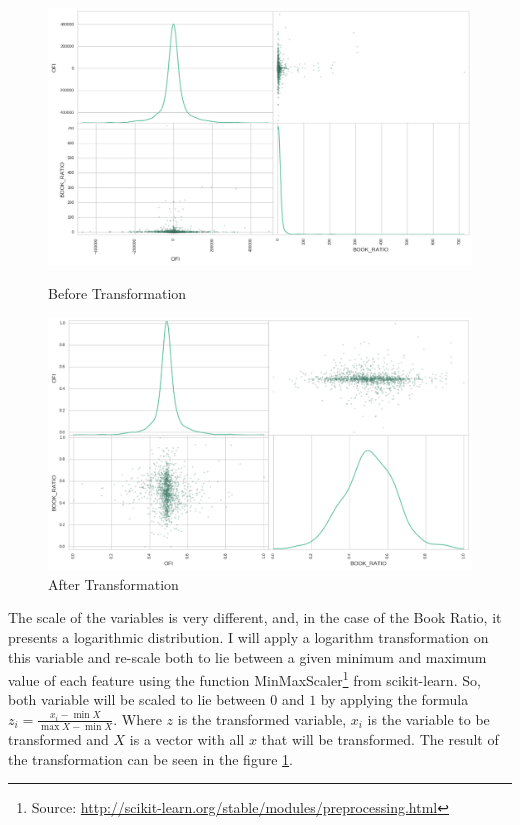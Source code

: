 \documentclass[a4paper]{article}
\begin{document}
\begin{figure}[ht!]
  \includegraphics[width=\linewidth]{figures/scatter_feat_1.png}
  \caption{\label{fig:features_one}Before Transformation}
\endminipage
{}
  \includegraphics[width=\linewidth]{figures/scatter_feat_2.png}
  \caption{\label{fig:features_two}After Transformation}
\endminipage
\end{figure}

The scale of the variables is very different, and, in the case of the Book Ratio, it presents a logarithmic distribution. I will apply a logarithm transformation on this variable and re-scale both to lie between a given minimum and maximum value of each feature using the function MinMaxScaler\footnote{Source: \url{http://scikit-learn.org/stable/modules/preprocessing.html}} from scikit-learn. So, both variable will be scaled to lie between $0$ and $1$ by applying the formula $z_{i} =\frac{x_i - \min{X}}{\max{X} - \min{X}}$. Where $z$ is the transformed variable, $x_i$ is the variable to be transformed and $X$ is a vector with all $x$ that will be transformed. The result of the transformation can be seen in the figure \ref{fig:features_two}.
\end{document}
